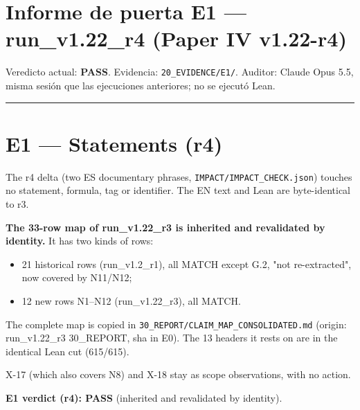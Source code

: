 \documentclass[
]{article}
\author{}
\date{}
\providecommand{\tightlist}{%
  \setlength{\itemsep}{0pt}\setlength{\parskip}{0pt}}
\begin{document}
\section{Informe de puerta E1 --- run\_v1.22\_r4 (Paper IV
v1.22-r4)}\label{informe-de-puerta-e1--run_v122_r4-paper-iv-v122-r4}

Veredicto actual: \textbf{PASS}. Evidencia: \texttt{20\_EVIDENCE/E1/}.
Auditor: Claude Opus 5.5, misma sesión que las ejecuciones anteriores;
no se ejecutó Lean.

\begin{center}\rule{0.5\linewidth}{0.5pt}\end{center}

\section{E1 --- Statements (r4)}\label{e1--statements-r4}

The r4 delta (two ES documentary phrases,
\texttt{IMPACT/IMPACT\_CHECK.json}) touches no statement, formula, tag
or identifier. The EN text and Lean are byte-identical to r3.

\textbf{The 33-row map of run\_v1.22\_r3 is inherited and revalidated by
identity.} It has two kinds of rows:

\begin{itemize}
\tightlist
\item
  21 historical rows (run\_v1.2\_r1), all MATCH except G.2, "not
  re-extracted", now covered by N11/N12;
\item
  12 new rows N1--N12 (run\_v1.22\_r3), all MATCH.
\end{itemize}

The complete map is copied in
\texttt{30\_REPORT/CLAIM\_MAP\_CONSOLIDATED.md} (origin: run\_v1.22\_r3
30\_REPORT, sha in E0). The 13 headers it rests on are in the identical
Lean cut (615/615).

X-17 (which also covers N8) and X-18 stay as scope observations, with no
action.

\textbf{E1 verdict (r4): PASS} (inherited and revalidated by identity).
\end{document}
